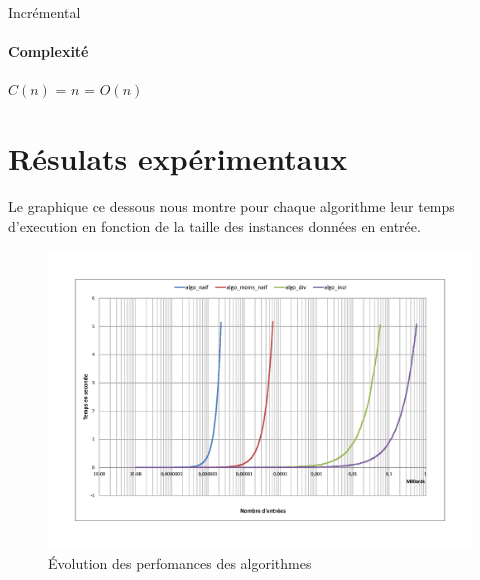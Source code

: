 \documentclass[11pt, a4paper]{article}
\begin{document}
\begin{algorithm}[H]
  \caption{Incrémental}
\end{algorithm}
\paragraph{Complexité}
$C(n)$ = $n$ = $O(n)$


\newpage
\section{Résulats expérimentaux}

Le graphique ce dessous nous montre pour chaque algorithme leur temps
d'execution en fonction de la taille des instances données en entrée.

\begin{figure}[h]
\includegraphics [scale=0.5]{images/comparatif.png}
\caption{Évolution des perfomances des algorithmes}
\label{courbe}
\end{figure}
\end{document}
